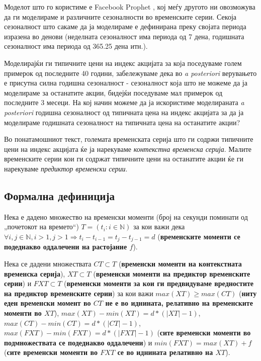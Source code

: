 \documentclass[12pt]{article}
\numberwithin{equation}{section}
\begin{document}
Моделот што го користиме е Facebook Prophet \cite{taylor2018forecasting}, кој меѓу другото ни овозможува да ги моделираме и различните сезоналности во временските серии. Секоја сезоналност што сакаме да ја моделираме е дефинирана преку својата периода изразена во денови (неделната сезоналност има периода од 7 дена, годишната сезоналност има периода од 365.25 дена итн.).

Моделирајќи ги типичните цени на индекс акцијата за која поседуваме голем примерок од последните 40 години, забележуваме дека во \textit{a posteriori} верувањето е присутна силна годишна сезоналност - сезоналност која што не можеме да ја моделираме за останатите акции, бидејќи поседуваме мал примерок од последните 3 месеци. На кој начин можеме да ја искористиме моделираната \textit{a posteriori} годишна сезоналност од типичната цена на индекс акцијата за да ја моделираме годишната сезоналност на типичната цена на останатите акции?

Во понатамошниот текст, големата временската серија што ги содржи типичните цени на индекс акцијата ќе ја нарекуваме \textit{контекстна временска серија}. Малите временските серии кои ги содржат типичните цени на останатите акции ќе ги нарекуваме \textit{предиктор временски серии}.

\subsection{Формална дефиниција}

Нека е дадено множество на временски моменти (број на секунди поминати од „почетокот на времето“) \(T = (t_i : i \in \mathbb{N})\) за кои важи дека \(\forall i, j \in \mathbb{N}, i > 1, j > 1 \Rightarrow t_i - t_{i-1} = t_j - t_{j - 1} = d \) (\textbf{временските моменти се подеднакво оддалечени на растојание \(f\)}).

Нека се дадени множествата \(CT \subset T\) (\textbf{временски моменти на контекстната временска серија}), \(XT \subset T\) (\textbf{временски моменти на предиктор временските серии}) и \(FXT \subset T\) (\textbf{временски моменти за кои ги предвидуваме вредностите на предиктор временските серии}) за кои важи \(max(XT) \geq max(CT)\) (\textbf{ниту еден временски момент во \(CT\) не е во иднината, релативно на временските моменти во \(XT\)}), \( max(XT) - min(XT) = d * (\lvert XT \rvert - 1) \), \( max(CT) - min(CT) = d * (\lvert CT \rvert - 1) \), \( max(FXT) - min(FXT) = d * (\lvert FXT \rvert - 1) \) (\textbf{сите временски моменти во подмножествата се подеднакво оддалечени}) и \(min(FXT) = max(XT) + f\) (\textbf{сите временски моменти во \(FXT\) се во иднината релативно на \(XT\)}).
\end{document}
